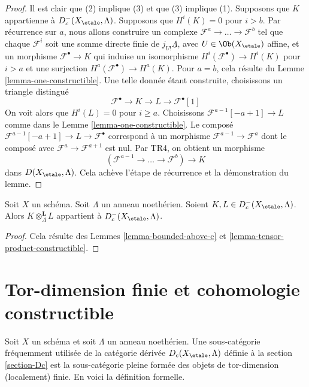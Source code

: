\begin{proof}
Il est clair que (2) implique (3) et que (3) implique (1).
Supposons que $K$ appartienne à $D_c^-(X_\etale, \Lambda)$.
Supposons que $H^i(K) = 0$ pour $i > b$. Par récurrence sur $a$,
nous allons construire un complexe $\mathcal{F}^a \to \ldots \to \mathcal{F}^b$
tel que chaque $\mathcal{F}^i$ soit une somme directe finie
de $j_{U!}\underline{\Lambda}$, avec $U \in \Ob(X_\etale)$ affine,
et un morphisme $\mathcal{F}^\bullet \to K$ qui induise un isomorphisme
$H^i(\mathcal{F}^\bullet) \to H^i(K)$ pour $i > a$ et une surjection
$H^a(\mathcal{F}^\bullet) \to H^a(K)$.
Pour $a = b$, cela résulte du Lemme \ref{lemma-one-constructible}.
Une telle donnée étant construite, choisissons un triangle distingué
$$
\mathcal{F}^\bullet \to K \to L \to \mathcal{F}^\bullet[1]
$$
On voit alors que $H^i(L) = 0$ pour $i \geq a$. Choisissons
$\mathcal{F}^{a - 1}[-a +1] \to L$ comme dans le
Lemme \ref{lemma-one-constructible}. Le composé
$\mathcal{F}^{a - 1}[-a +1] \to L \to \mathcal{F}^\bullet$
correspond à un morphisme $\mathcal{F}^{a - 1} \to \mathcal{F}^a$
dont le composé avec $\mathcal{F}^a \to \mathcal{F}^{a + 1}$
est nul. Par TR4, on obtient un morphisme
$$
(\mathcal{F}^{a - 1} \to \ldots \to \mathcal{F}^b) \to K
$$
dans $D(X_\etale, \Lambda)$. Cela achève l'étape de récurrence et la
démonstration du lemme.
\end{proof}

\begin{lemma}
\label{lemma-tensor-c}
Soit $X$ un schéma. Soit $\Lambda$ un anneau noethérien.
Soient $K, L \in D_c^-(X_\etale, \Lambda)$. Alors
$K \otimes_\Lambda^\mathbf{L} L$ appartient à $D_c^-(X_\etale, \Lambda)$.
\end{lemma}

\begin{proof}
Cela résulte des Lemmes \ref{lemma-bounded-above-c} et
\ref{lemma-tensor-product-constructible}.
\end{proof}




\section{Tor-dimension finie et cohomologie constructible}
\label{section-ctf}

\noindent
Soit $X$ un schéma et soit $\Lambda$ un anneau noethérien. Une sous-catégorie
fréquemment utilisée de la catégorie dérivée $D_c(X_\etale, \Lambda)$ définie
à la section \ref{section-Dc} est la sous-catégorie pleine formée des objets
de tor-dimension (localement) finie. En voici la définition formelle.


